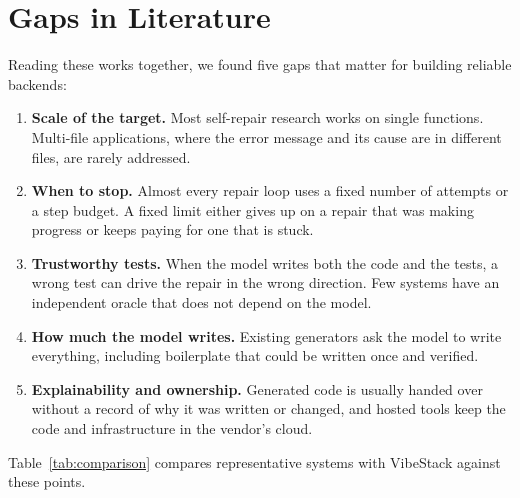 \documentclass[12pt,a4paper]{report}
\begin{document}
\section{Gaps in Literature}

Reading these works together, we found five gaps that matter for building reliable backends:

\begin{enumerate}
    \item \textbf{Scale of the target.} Most self-repair research works on single functions. Multi-file applications, where the error message and its cause are in different files, are rarely addressed.
    \item \textbf{When to stop.} Almost every repair loop uses a fixed number of attempts or a step budget. A fixed limit either gives up on a repair that was making progress or keeps paying for one that is stuck.
    \item \textbf{Trustworthy tests.} When the model writes both the code and the tests, a wrong test can drive the repair in the wrong direction. Few systems have an independent oracle that does not depend on the model.
    \item \textbf{How much the model writes.} Existing generators ask the model to write everything, including boilerplate that could be written once and verified.
    \item \textbf{Explainability and ownership.} Generated code is usually handed over without a record of why it was written or changed, and hosted tools keep the code and infrastructure in the vendor's cloud.
\end{enumerate}

Table~\ref{tab:comparison} compares representative systems with VibeStack against these points.
\end{document}
